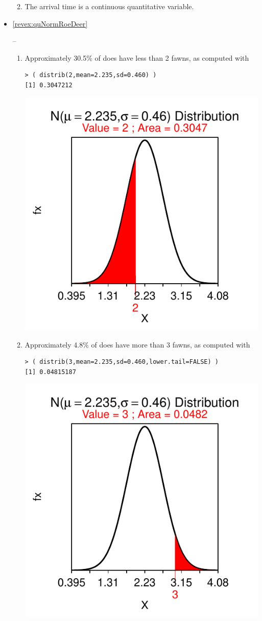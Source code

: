 \documentclass[10pt,openany]{book}\usepackage[]{graphicx}\usepackage[]{color}
\makeatletter
\newenvironment{kframe}{%
 \def\at@end@of@kframe{}%
 \ifinner\ifhmode%
  \def\at@end@of@kframe{\end{minipage}}%
  \begin{minipage}{\columnwidth}%
 \fi\fi%
 \def\FrameCommand##1{\hskip\@totalleftmargin \hskip-\fboxsep
 \colorbox{shadecolor}{##1}\hskip-\fboxsep
     \hskip-\linewidth \hskip-\@totalleftmargin \hskip\columnwidth}%
 \MakeFramed {\advance\hsize-\width
   \@totalleftmargin\z@ \linewidth\hsize
   \@setminipage}}%
 {\par\unskip\endMakeFramed%
 \at@end@of@kframe}
\newenvironment{knitrout}{}{} %
\makeatother
\begin{document}
\begin{itemize}
\begin{enumerate}
\begin{knitrout}
{}



\end{knitrout}
      \item The arrival time is a continuous quantitative variable.
    \end{enumerate}

  \item \hypertarget{ans:quNormRoeDeer}{\ref{revex:quNormRoeDeer}} --
    \begin{enumerate}
      \item Approximately 30.5\% of does have less than 2 fawns, as computed with
\begin{knitrout}
\color{fgcolor}\begin{kframe}
\begin{verbatim}
> ( distrib(2,mean=2.235,sd=0.460) )
[1] 0.3047212
\end{verbatim}
\end{kframe}

{\centering \includegraphics[width=.4\linewidth]{Figs/unnamed-chunk-237-1} 

}



\end{knitrout}
      \item Approximately 4.8\% of does have more than 3 fawns, as computed with
\begin{knitrout}
\color{fgcolor}\begin{kframe}
\begin{verbatim}
> ( distrib(3,mean=2.235,sd=0.460,lower.tail=FALSE) )
[1] 0.04815187
\end{verbatim}
\end{kframe}

{\centering \includegraphics[width=.4\linewidth]{Figs/unnamed-chunk-238-1} 

}
\end{knitrout}
\end{enumerate}
\end{itemize}
\end{document}
